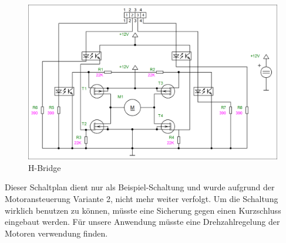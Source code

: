 \begin{figure}[H] 
\begin{center}

\includegraphics[width=15cm]{Bilder/Schaltplan/Schaltplan_HBridge}
\caption{H-Bridge}
\label{HBridge}

\end{center}
\end{figure}

Dieser Schaltplan dient nur als Beispiel-Schaltung und wurde aufgrund der Motoransteuerung Variante 2, nicht mehr weiter verfolgt. Um die Schaltung wirklich benutzen zu können, müsste eine Sicherung gegen einen Kurzschluss eingebaut werden. Für unsere Anwendung müsste eine Drehzahlregelung der Motoren verwendung finden.
\newpage
